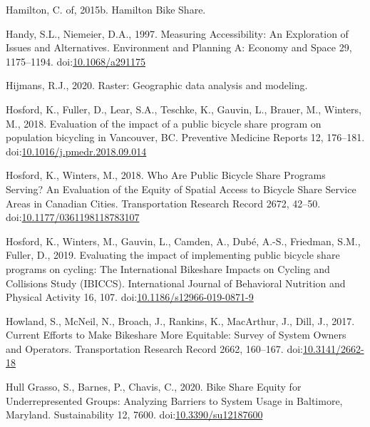 \documentclass[]{elsarticle} %
\begin{document}
\leavevmode\hypertarget{ref-hamiltonHamiltonBikeShare2015}{}%
Hamilton, C. of, 2015b. Hamilton Bike Share.

\leavevmode\hypertarget{ref-handyMeasuringAccessibilityExploration1997}{}%
Handy, S.L., Niemeier, D.A., 1997. Measuring Accessibility: An
Exploration of Issues and Alternatives. Environment and Planning A:
Economy and Space 29, 1175--1194.
doi:\href{https://doi.org/10.1068/a291175}{10.1068/a291175}

\leavevmode\hypertarget{ref-R-raster}{}%
Hijmans, R.J., 2020. Raster: Geographic data analysis and modeling.

\leavevmode\hypertarget{ref-hosfordEvaluationImpactPublic2018}{}%
Hosford, K., Fuller, D., Lear, S.A., Teschke, K., Gauvin, L., Brauer,
M., Winters, M., 2018. Evaluation of the impact of a public bicycle
share program on population bicycling in Vancouver, BC. Preventive
Medicine Reports 12, 176--181.
doi:\href{https://doi.org/10.1016/j.pmedr.2018.09.014}{10.1016/j.pmedr.2018.09.014}

\leavevmode\hypertarget{ref-hosfordWhoArePublic2018}{}%
Hosford, K., Winters, M., 2018. Who Are Public Bicycle Share Programs
Serving? An Evaluation of the Equity of Spatial Access to Bicycle Share
Service Areas in Canadian Cities. Transportation Research Record 2672,
42--50.
doi:\href{https://doi.org/10.1177/0361198118783107}{10.1177/0361198118783107}

\leavevmode\hypertarget{ref-hosfordEvaluatingImpactImplementing2019}{}%
Hosford, K., Winters, M., Gauvin, L., Camden, A., Dubé, A.-S., Friedman,
S.M., Fuller, D., 2019. Evaluating the impact of implementing public
bicycle share programs on cycling: The International Bikeshare Impacts
on Cycling and Collisions Study (IBICCS). International Journal of
Behavioral Nutrition and Physical Activity 16, 107.
doi:\href{https://doi.org/10.1186/s12966-019-0871-9}{10.1186/s12966-019-0871-9}

\leavevmode\hypertarget{ref-howlandCurrentEffortsMake2017}{}%
Howland, S., McNeil, N., Broach, J., Rankins, K., MacArthur, J., Dill,
J., 2017. Current Efforts to Make Bikeshare More Equitable: Survey of
System Owners and Operators. Transportation Research Record 2662,
160--167. doi:\href{https://doi.org/10.3141/2662-18}{10.3141/2662-18}

\leavevmode\hypertarget{ref-hullgrassoBikeShareEquity2020}{}%
Hull Grasso, S., Barnes, P., Chavis, C., 2020. Bike Share Equity for
Underrepresented Groups: Analyzing Barriers to System Usage in
Baltimore, Maryland. Sustainability 12, 7600.
doi:\href{https://doi.org/10.3390/su12187600}{10.3390/su12187600}
\end{document}
